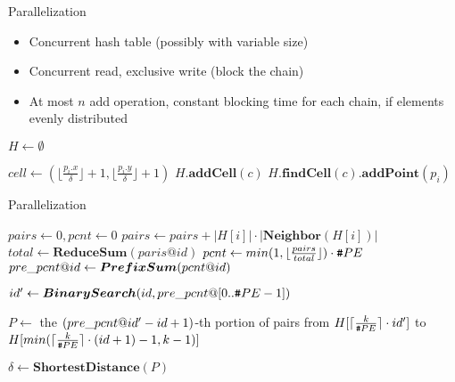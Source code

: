 \documentclass[18pt]{beamer}
\begin{document}
\begin{frame}{Parallelization}
\begin{itemize}
\item Concurrent hash table (possibly with variable size)
\item Concurrent read, exclusive write (block the chain)
\item At most $n$ add operation, constant blocking time for each chain, if elements evenly distributed
\end{itemize}
\begin{algorithmic}[1]
\State $H \gets \emptyset$
	
\State $cell \gets (\lfloor \frac{p_i.x}{\delta}\rfloor+1,\lfloor \frac{p_i.y}{\delta}\rfloor+1 )$ 
	\State $H.\boldsymbol{addCell}(c)$ 
\EndIf
\State $H.\boldsymbol{findCell}(c).\boldsymbol{addPoint}(p_i)$
\EndFor
\EndProcedure
\end{algorithmic}

\end{frame}

\begin{frame}{Parallelization}
\begin{algorithmic}[1]
\State $pairs \gets 0, pcnt \gets 0$
	\State $pairs \gets pairs + |H[i]| \cdot |\boldsymbol{Neighbor}(H[i])|$
\EndFor
\State $total \gets \boldsymbol{ReduceSum}(paris@id)$ 
	\State $pcnt \gets min (1, \lfloor \frac{pairs}{total} \rfloor) \cdot \texttt{\#} PE$
\EndIf
\State $pre\_pcnt \text{@} id \gets \boldsymbol{PrefixSum}(pcnt \text{@} id)$

\State $id' \gets \boldsymbol{BinarySearch}(id, pre\_pcnt \text{@} [0..\texttt{\#} PE-1])$  

\State $P \gets$ the $(pre\_pcnt \text{@} id' - id + 1)$-th portion of pairs from $H[\lceil \frac{k}{\texttt{\#} PE} \rceil\cdot id']$ to $H[min ( \lceil \frac{k}{\texttt{\#} PE} \rceil \cdot (id + 1) - 1, k-1)]$  

\State $\delta \gets \boldsymbol{ShortestDistance}(P)$ 

\EndProcedure
\end{algorithmic}
\end{frame}
\end{document}
